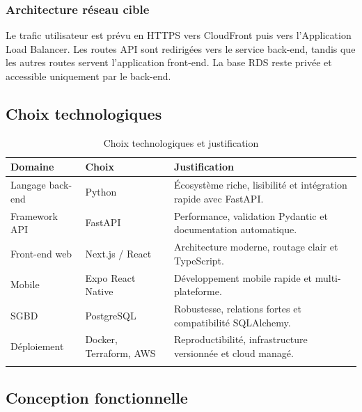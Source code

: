 \documentclass{rapportENSET}
\begin{document}
\subsubsection{Architecture réseau cible}
Le trafic utilisateur est prévu en HTTPS vers CloudFront puis vers l'Application Load Balancer. Les routes API sont redirigées vers le service back-end, tandis que les autres routes servent l'application front-end. La base RDS reste privée et accessible uniquement par le back-end.

\subsection{Choix technologiques}
\begin{longtable}{@{}L{0.24\textwidth}L{0.26\textwidth}L{0.40\textwidth}@{}}
\toprule
\textbf{Domaine} & \textbf{Choix} & \textbf{Justification} \\
\midrule
\endhead
Langage back-end & Python & Écosystème riche, lisibilité et intégration rapide avec FastAPI. \\
Framework API & FastAPI & Performance, validation Pydantic et documentation automatique. \\
Front-end web & Next.js / React & Architecture moderne, routage clair et TypeScript. \\
Mobile & Expo React Native & Développement mobile rapide et multi-plateforme. \\
SGBD & PostgreSQL & Robustesse, relations fortes et compatibilité SQLAlchemy. \\
Déploiement & Docker, Terraform, AWS & Reproductibilité, infrastructure versionnée et cloud managé. \\
\bottomrule
\caption{Choix technologiques et justification}
\end{longtable}

\subsection{Conception fonctionnelle}
\end{document}
